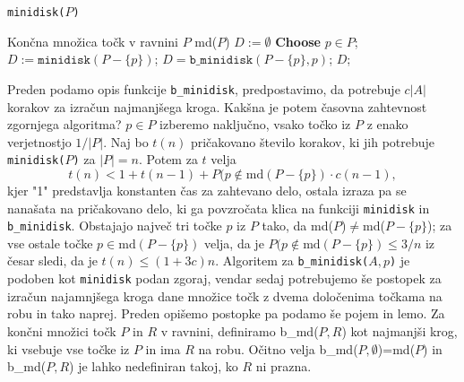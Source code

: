 \documentclass[a4paper]{article}
\begin{document}
\begin{algorithm}[h]
\caption {\texttt{minidisk($P$)}}
\begin{algorithmic} 
\REQUIRE Končna množica točk v ravnini $P$ 
\ENSURE md($P$)
\STATE $D := \emptyset$
\ELSE
\STATE \textbf{Choose} $p  \in P$;
\STATE $D := \texttt{minidisk}(P-\{p\})$;
\STATE $D = \texttt{b\_minidisk}(P-\{p\},p)$;
\ENDIF
\ENDIF
\RETURN $D$;
\end{algorithmic}
\end{algorithm}

Preden podamo opis funkcije \texttt{b\_minidisk}, predpostavimo, da potrebuje $c|A|$ korakov za izračun najmanjšega kroga. Kakšna je potem časovna zahtevnost zgornjega algoritma?
$p \in P$ izberemo naključno, vsako točko iz $P$ z enako verjetnostjo $1/|P|$. Naj bo $t(n)$  pričakovano število korakov, ki jih potrebuje \texttt{minidisk($P$)} za $|P|=n$. Potem za $t$ velja
$$t(n) < 1 +t(n-1) + P(p\notin \mathrm{md}(P-\{p\})  \cdot c(n-1),$$
kjer "1" predstavlja konstanten čas za zahtevano delo, ostala izraza pa se nanašata na pričakovano delo, ki ga povzročata klica na funkciji \texttt{minidisk} in \texttt{b\_minidisk}. Obstajajo največ tri točke $p$ iz $P$ tako, da md($P$)$\neq$md($P- \{p\}$); za vse ostale točke $p\in \mathrm{md}(P-\{p\})$ velja, da je $P(p\notin \mathrm{md}(P-\{p\}) \leq 3/n$ iz česar sledi, da je $t(n) \leq (1+3c)n.$
\newline Algoritem za \texttt{b\_minidisk($A,p$)} je podoben kot \texttt{minidisk} podan zgoraj, vendar sedaj potrebujemo še postopek za izračun najamnjšega kroga dane množice točk z dvema določenima točkama na robu  in tako naprej. Preden opišemo postopke pa podamo še pojem in lemo. 
\newline Za končni množici točk $P$ in $R$ v ravnini, definiramo b\_md($P,R$) kot najmanjši krog, ki vsebuje vse točke iz $P$ in ima $ R$ na robu. Očitno velja b\_md($P,\emptyset $)=md($P$) in b\_md($P,R$) je lahko nedefiniran takoj, ko $R$ ni prazna.
\end{document}
